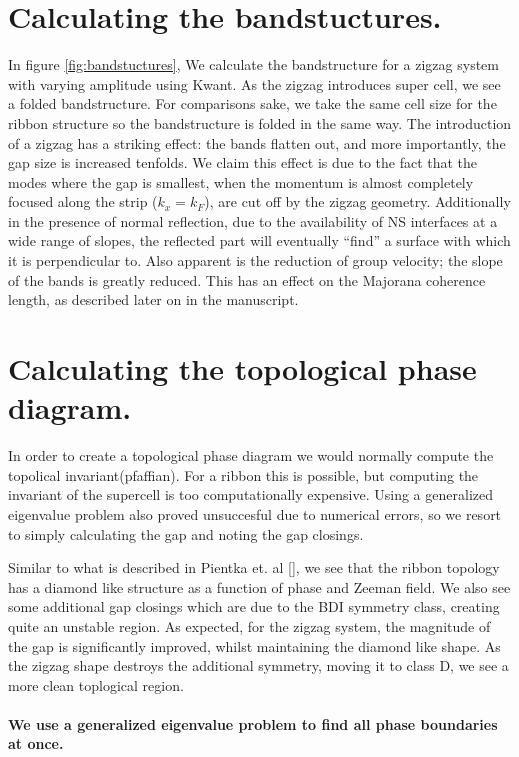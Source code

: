 \documentclass[english, twocolumn, 10pt, aps, superscriptaddress, floatfix, prb, citeautoscript]{revtex4-1}
\renewcommand{\comment}[2]{#2}
\renewcommand{\comment}{\paragraph}
\begin{document}
\section{Calculating the bandstuctures.}
In figure \ref{fig:bandstuctures}, We calculate the bandstructure for a zigzag system with varying amplitude using Kwant.
As the zigzag introduces super cell, we see a folded bandstructure.
For comparisons sake, we take the same cell size for the ribbon structure so the bandstructure is folded in the same way.
The introduction of a zigzag has a striking effect: the bands flatten out, and more importantly, the gap size is increased tenfolds.
We claim this effect is due to the fact that the modes where the gap is smallest, when the momentum is almost completely focused along the strip ($k_x=k_F$), are cut off by the zigzag geometry.
Additionally in the presence of normal reflection, due to the availability of NS interfaces at a wide range of slopes, the reflected part will eventually ``find'' a surface with which it is perpendicular to.
Also apparent is the reduction of group velocity; the slope of the bands is greatly reduced. This has an effect on the Majorana coherence length, as described later on in the manuscript.

\section{Calculating the topological phase diagram.}
In order to create a topological phase diagram we would normally compute the topolical invariant(pfaffian).
For a ribbon this is possible, but computing the invariant of the supercell is too computationally expensive.
Using a generalized eigenvalue problem also proved unsuccesful due to numerical errors, so we resort to simply calculating the gap and noting the gap closings.

Similar to what is described in Pientka et. al [\cite{pientka2017topological}], we see that the ribbon topology has a diamond like structure as a function of phase and Zeeman field.
We also see some additional gap closings which are due to the BDI symmetry class, creating quite an unstable region.
As expected, for the zigzag system, the magnitude of the gap is significantly improved, whilst maintaining the diamond like shape.
As the zigzag shape destroys the additional symmetry, moving it to class D, we see a more clean toplogical region.
\comment{We use a generalized eigenvalue problem to find all phase boundaries at once.}
\end{document}
